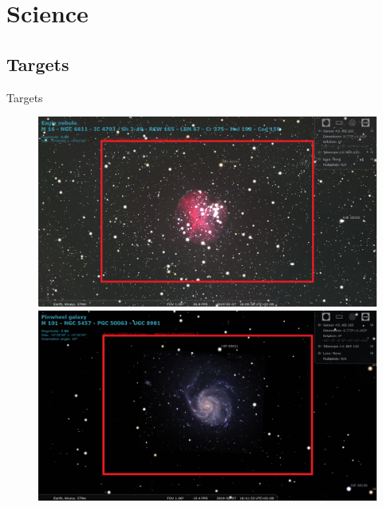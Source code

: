 \documentclass[11pt, aspectratio=169]{beamer}
\begin{document}
\section{Science}
\subsection{Targets}
\begin{frame}{Targets}
\vspace{-0.27cm}
\begin{figure}[!htb]
    \begin{minipage}[t]{.425\textwidth}
        \centering
        \includegraphics[width=\linewidth]{figures/targets/Eagle.png}
    \end{minipage}%
	\begin{minipage}[t]{.425\textwidth}
        \centering
        \includegraphics[width=\linewidth]{figures/targets/Pinwheel.png}
    \end{minipage}%
	\vspace{-0.02cm}  
    \begin{minipage}[t]{.425\textwidth}
        \centering

\end{minipage}
\end{figure}
\end{frame}
\end{document}
